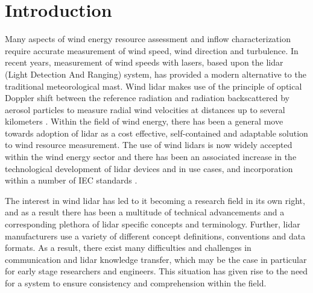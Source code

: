 \documentclass[remotesensing,article,submit,pdftex,moreauthors]{Definitions/mdpi}
\begin{document}



\section{Introduction}
Many aspects of wind energy resource assessment and inflow characterization require accurate measurement of wind speed, wind direction and turbulence. In recent years, measurement of wind speeds with lasers, based upon the lidar (Light Detection And Ranging) system, has provided a modern alternative to the traditional meteorological mast. Wind lidar makes use of the principle of optical Doppler shift between the reference radiation and radiation backscattered by aerosol particles to measure radial wind velocities at distances up to several kilometers \cite{ref-Liu}.
Within the field of wind energy, there has been a general move towards adoption of lidar as a cost effective, self-contained and adaptable solution to wind resource measurement.
The use of wind lidars is now widely accepted within the wind energy sector and there has been an associated increase in the technological development of lidar devices and in use cases, and incorporation within a number of IEC standards \cite{ref-IEC61400-12-1, ref-IEC61400-50-3}.

The interest in wind lidar has led to it becoming a research field in its own right, and as a result there has been a multitude of technical advancements and a corresponding plethora of lidar specific concepts and terminology. 
Further, lidar manufacturers use a variety of different concept definitions, conventions and data formats.
As a result, there exist many difficulties and challenges in communication and lidar knowledge transfer, which may be the case in particular for early stage researchers and engineers. This situation has given rise to the need for a system to ensure consistency and comprehension within the field.
\end{document}
